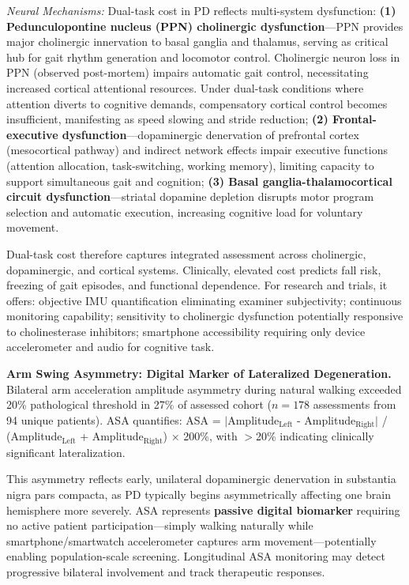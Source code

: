 \documentclass[11pt]{article}
\begin{document}
\textit{Neural Mechanisms:} Dual-task cost in PD reflects multi-system dysfunction\cite{bohnen2013cholinergic,raffegeau2019meta,perez2016cholinergic}: \textbf{(1) Pedunculopontine nucleus (PPN) cholinergic dysfunction}—PPN provides major cholinergic innervation to basal ganglia and thalamus, serving as critical hub for gait rhythm generation and locomotor control. Cholinergic neuron loss in PPN (observed post-mortem) impairs automatic gait control, necessitating increased cortical attentional resources. Under dual-task conditions where attention diverts to cognitive demands, compensatory cortical control becomes insufficient, manifesting as speed slowing and stride reduction; \textbf{(2) Frontal-executive dysfunction}—dopaminergic denervation of prefrontal cortex (mesocortical pathway) and indirect network effects impair executive functions (attention allocation, task-switching, working memory), limiting capacity to support simultaneous gait and cognition; \textbf{(3) Basal ganglia-thalamocortical circuit dysfunction}—striatal dopamine depletion disrupts motor program selection and automatic execution, increasing cognitive load for voluntary movement.

Dual-task cost therefore captures integrated assessment across cholinergic, dopaminergic, and cortical systems. Clinically, elevated cost predicts fall risk, freezing of gait episodes, and functional dependence. For research and trials, it offers: objective IMU quantification eliminating examiner subjectivity; continuous monitoring capability; sensitivity to cholinergic dysfunction potentially responsive to cholinesterase inhibitors; smartphone accessibility requiring only device accelerometer and audio for cognitive task.

\textbf{Arm Swing Asymmetry: Digital Marker of Lateralized Degeneration.} Bilateral arm acceleration amplitude asymmetry during natural walking exceeded 20\% pathological threshold in 27\% of assessed cohort ($n=178$ assessments from 94 unique patients). ASA quantifies: ASA = $|$Amplitude$_{\text{Left}}$ - Amplitude$_{\text{Right}}|$ / (Amplitude$_{\text{Left}}$ + Amplitude$_{\text{Right}}$) $\times$ 200\%, with $>$20\% indicating clinically significant lateralization.

This asymmetry reflects early, unilateral dopaminergic denervation in substantia nigra pars compacta, as PD typically begins asymmetrically affecting one brain hemisphere more severely. ASA represents \textbf{passive digital biomarker} requiring no active patient participation—simply walking naturally while smartphone/smartwatch accelerometer captures arm movement—potentially enabling population-scale screening\cite{mirelman2024wearable,adams2024using}. Longitudinal ASA monitoring may detect progressive bilateral involvement and track therapeutic responses.
\end{document}
